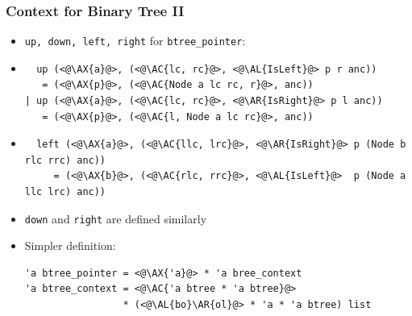 \begin{frame}[fragile]
\frametitle{Context for Binary Tree II}

\newcommand{\AX}[1]{\textcolor{red}{#1}}
\newcommand{\AC}[1]{\textcolor{blue}{#1}}
\newcommand{\AL}[1]{\textcolor[RGB]{0,170,0}{#1}}
\newcommand{\AR}[1]{\textcolor{cyan}{#1}}
\newcommand{\AT}[1]{\textcolor{gray}{#1}}

\begin{itemize}[<+->]
\item \lstinline|up, down, left, right| for \lstinline|btree_pointer|:

\item
\begin{lstlisting}
  up (<@\AX{a}@>, (<@\AC{lc, rc}@>, <@\AL{IsLeft}@> p r anc))
   = (<@\AX{p}@>, (<@\AC{Node a lc rc, r}@>, anc))
| up (<@\AX{a}@>, (<@\AC{lc, rc}@>, <@\AR{IsRight}@> p l anc))
   = (<@\AX{p}@>, (<@\AC{l, Node a lc rc}@>, anc))
\end{lstlisting}

\item
\begin{lstlisting}
  left (<@\AX{a}@>, (<@\AC{llc, lrc}@>, <@\AR{IsRight}@> p (Node b rlc rrc) anc))
     = (<@\AX{b}@>, (<@\AC{rlc, rrc}@>, <@\AL{IsLeft}@>  p (Node a llc lrc) anc))
\end{lstlisting}

\item \lstinline|down| and \lstinline|right| are defined similarly

\item Simpler definition:\\
\begin{lstlisting}
'a btree_pointer = <@\AX{'a}@> * 'a bree_context
'a btree_context = <@\AC{'a btree * 'a btree}@>
                 * (<@\AL{bo}\AR{ol}@> * 'a * 'a btree) list
\end{lstlisting}
\end{itemize}
\end{frame}

